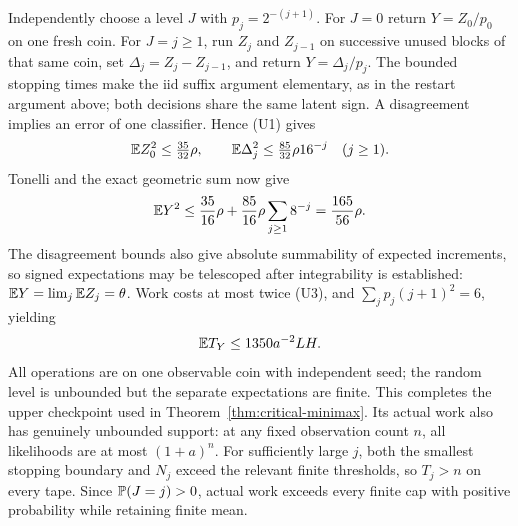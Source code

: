 Independently choose a level $J$ with $p_j=2^{-(j+1)}$. For $J=0$ return
$Y=Z_0/p_0$ on one fresh coin. For $J=j\ge1$, run $Z_j$ and $Z_{j-1}$
on successive unused blocks of that same coin, set $\Delta_j=Z_j-Z_{j-1}$,
and return $Y=\Delta_j/p_j$. The bounded stopping times make the iid suffix
argument elementary, as in the restart argument above; both decisions share
the same latent sign. A disagreement implies an error of one classifier.
Hence (U1) gives
\[
 \mathbb E Z_0^2\le\tfrac{35}{32}\rho,
 \qquad \mathbb E\Delta_j^2\le\tfrac{85}{32}\rho16^{-j}\quad(j\ge1).
\]
Tonelli and the exact geometric sum now give
\[
 \mathbb E Y^2\le\frac{35}{16}\rho+
                 \frac{85}{16}\rho\sum_{j\ge1}8^{-j}
            =\frac{165}{56}\rho.
\]
The disagreement bounds also give absolute summability of expected increments,
so signed expectations may be telescoped after integrability is established:
$\mathbb E Y=\lim_j\mathbb E Z_j=\theta$. Work costs at most twice (U3), and
$\sum_jp_j(j+1)^2=6$, yielding
\[
 \mathbb E T_Y\le1350a^{-2}LH.
\]
All operations are on one observable coin with independent seed; the random
level is unbounded but the separate expectations are finite. This completes
the upper checkpoint used in Theorem~\ref{thm:critical-minimax}.
Its actual work also has genuinely unbounded support: at any fixed observation
count $n$, all likelihoods are at most $(1+a)^n$. For sufficiently large $j$,
both the smallest stopping boundary and $N_j$ exceed the relevant finite
thresholds, so $T_j>n$ on every tape. Since $\mathbb P(J=j)>0$, actual work exceeds
every finite cap with positive probability while retaining finite mean.

